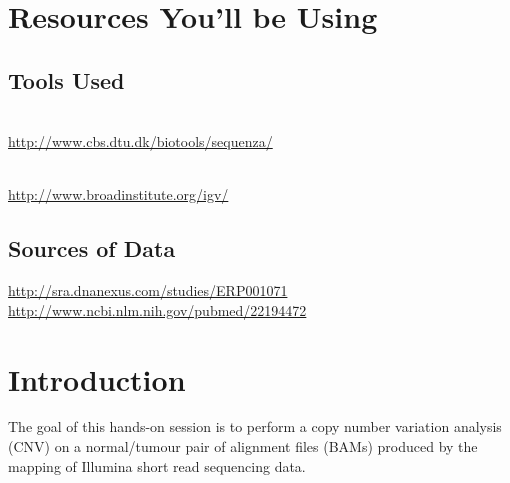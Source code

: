 
\section{Resources You'll be Using}

\subsection{Tools Used}

\begin{description}[style=multiline,labelindent=0cm,align=left,leftmargin=1cm]
  \item[Sequenza] \hfill\\
    \url{http://www.cbs.dtu.dk/biotools/sequenza/}
  \item[IGV] \hfill\\
    \url{http://www.broadinstitute.org/igv/}
\end{description}


\subsection{Sources of Data}

\url{http://sra.dnanexus.com/studies/ERP001071}\\
\url{http://www.ncbi.nlm.nih.gov/pubmed/22194472}


\newpage


\section{Introduction}

The goal of this hands-on session is to perform a copy number variation analysis (CNV) on a normal/tumour pair of alignment files (BAMs) produced by the mapping of Illumina short read sequencing data. 

